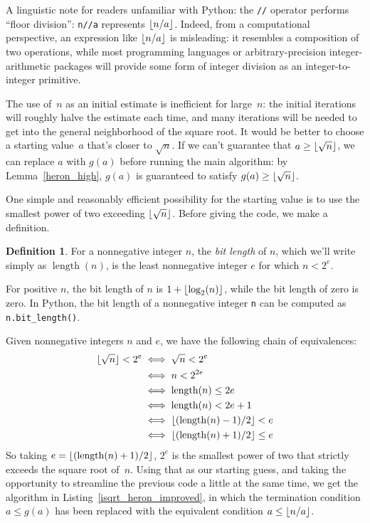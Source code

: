 \documentclass[a4paper]{article}
\DeclarePairedDelimiter\floor{\lfloor}{\rfloor}
\DeclareMathOperator{\length}{length}
\theoremstyle{plain}
\theoremstyle{definition}
\newtheorem{definition}[theorem]{Definition}
\begin{document}
A linguistic note for readers unfamiliar with Python: the \lstinline$//$
operator performs ``floor division'': \lstinline$n//a$ represents $\floor{n /
a}$. Indeed, from a computational perspective, an expression like $\floor{n /
a}$ is misleading: it resembles a composition of two operations, while most
programming languages or arbitrary-precision integer-arithmetic packages will
provide some form of integer division as an integer-to-integer primitive.



The use of~$n$ as an initial estimate is inefficient for large~$n$: the initial
iterations will roughly halve the estimate each time, and many iterations will
be needed to get into the general neighborhood of the square root. It would be
better to choose a starting value~$a$ that's closer to $\sqrt n$. If we can't
guarantee that $a\ge \floor{\sqrt n}$, we can replace $a$ with $g(a)$ before
running the main algorithm: by Lemma~\ref{heron_high}, $g(a)$ is guaranteed to
satisfy $g(a) \ge \floor{\sqrt n}$.

One simple and reasonably efficient possibility for the starting value is to
use the smallest power of two exceeding $\floor{\sqrt n}$. Before giving the
code, we make a definition.

\begin{definition}
  For a nonnegative integer $n$, the \emph{bit length} of $n$, which we'll
  write simply as $\length(n)$, is the least nonnegative integer $e$ for which
  $n < 2^e$.
\end{definition}

For positive $n$, the bit length of $n$ is $1 + \floor{\log_2(n)}$, while the
bit length of zero is zero. In Python, the bit length of a nonnegative integer
\lstinline$n$ can be computed as \lstinline$n.bit_length()$.

Given nonnegative integers $n$ and $e$, we have the following chain
of equivalences:
\begin{align*}
  \floor{\sqrt n} < 2^e
    &\iff \sqrt n < 2^e \\
    &\iff n < 2^{2e} \\
    &\iff \length(n) \le 2e \\
    &\iff \length(n) < 2e + 1 \\
    &\iff \floor{(\length(n) - 1) / 2} < e \\
    &\iff \floor{(\length(n) + 1) / 2} \le e
\end{align*}
So taking $e = \floor{(\length(n) + 1) / 2}$, $2^e$ is the smallest power of
two that strictly exceeds the square root of~$n$. Using that as our starting
guess, and taking the opportunity to streamline the previous code a little at
the same time, we get the algorithm in Listing~\ref{isqrt_heron_improved}, in
which the termination condition $a \le g(a)$ has been replaced with the
equivalent condition $a \le \floor{n/a}$.
\end{document}
